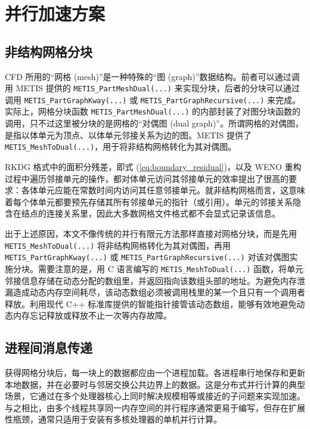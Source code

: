 \newpage{}

\section{并行加速方案\label{sec:parallel}}



\subsection{非结构网格分块}

CFD 所用的“网格 (mesh)”是一种特殊的“图 (graph)”数据结构。前者可以通过调用
METIS 提供的 \texttt{METIS\_PartMeshDual(...)} 来实现分块，后者的分块可以通过调用
\texttt{METIS\_PartGraphKway(...)} 或 \texttt{METIS\_PartGraphRecursive(...)}
来完成。实际上，网格分块函数 \texttt{METIS\_PartMeshDual(...)} 的内部封装了对图分块函数的调用，只不过这里被分块的是网格的“对偶图
(dual graph)”。所谓网格的对偶图，是指以体单元为顶点、以体单元邻接关系为边的图。METIS 提供了 \texttt{METIS\_MeshToDual(...)}，用于将非结构网格转化为其对偶图。

RKDG 格式中的面积分残差，即式 (\ref{eq:boundary_residual})，以及 WENO 重构过程中遍历邻接单元的操作，都对体单元访问其邻接单元的效率提出了很高的要求：各体单元应能在常数时间内访问其任意邻接单元。就非结构网格而言，这意味着每个体单元都要预先存储其所有邻接单元的指针（或引用）。单元的邻接关系隐含在结点的连接关系里，因此大多数网格文件格式都不会显式记录该信息。

出于上述原因，本文不像传统的并行有限元方法那样直接对网格分块，而是先用 \texttt{METIS\_MeshToDual(...)}
将非结构网格转化为其对偶图，再用 \texttt{METIS\_PartGraphKway(...)} 或 \texttt{METIS\_PartGraphRecursive(...)}
对该对偶图实施分块。需要注意的是，用 C 语言编写的 \texttt{METIS\_MeshToDual(...)} 函数，将单元邻接信息存储在动态分配的数组里，并返回指向该数组头部的地址。为避免内存泄漏造成动态内存空间耗尽，该动态数组必须被调用栈里的某一个且只有一个调用者释放。利用现代
C++ 标准库提供的智能指针接管该动态数组，能够有效地避免动态内存忘记释放或释放不止一次等内存故障。

\subsection{进程间消息传递}

获得网格分块后，每一块上的数据都应由一个进程加载。各进程串行地保存和更新本地数据，并在必要时与邻居交换公共边界上的数据。这是分布式并行计算的典型场景，它通过在多个处理器核心上同时解决规模相等或接近的子问题来实现加速。与之相比，由多个线程共享同一内存空间的并行程序通常更易于编写，但存在扩展性瓶颈，通常只适用于安装有多核处理器的单机并行计算。

